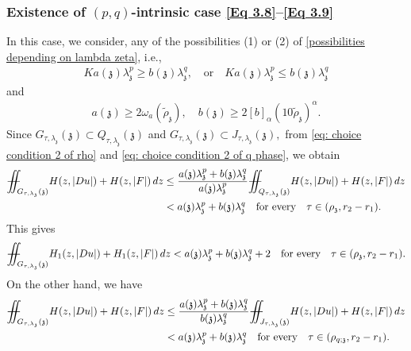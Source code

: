\documentclass[11pt,oneside, english,reqno,twoside a4paper]{amsart}
\theoremstyle{definition}
\numberwithin{theorem}{section}
\numberwithin{equation}{section}
\newcommand{\mfz}{\mathfrak{z}}
\newcommand{\iintss}{{\int\hspace{-0.28cm}\int}}
\newcommand{ \miints }{{\iintss\hspace{-0.56cm} -\hspace{-0.15cm}-}}
\newcommand{\miint}[1]{{\miints_{\hspace{-0.13cm}#1}}}
\begin{document}
\subsubsection{Existence of $(p,q)$-intrinsic case \eqref{Eq 3.8}--\eqref{Eq 3.9}} \label{deduction of pq case}
In this case, we consider, any of the possibilities (1)
or (2) of \eqref{possibilities depending on lambda zeta}, i.e., 
\begin{align*}
 Ka(\mathfrak z)\lambda^p_{\mfz}\geq b(\mfz)\lambda^q_{\mfz}, \quad \text{or}\quad Ka(\mathfrak z)\lambda^p_{\mfz}\leq b(\mfz)\lambda^q_{\mfz}   
\end{align*}
and 
\begin{align}\label{eq: pq phase assmp on ab}
a(\mathfrak{z})\geq 2\omega_a(\widetilde \rho_{\mathfrak{z}}),\quad b(\mathfrak{z})\geq 2[b]_{\alpha}\left(10 \widetilde \rho_{ \mathfrak{z}}\right)^{\alpha}.   
\end{align}
Since $G_{\tau, \lambda_{\mathfrak z}}(\mathfrak z)\subset Q_{\tau, \lambda_{\mathfrak z}}(\mathfrak z)$ and $G_{\tau, \lambda_{\mathfrak z}}(\mathfrak z)\subset J_{\tau, \lambda_{\mathfrak z}}(\mathfrak z),$ from \eqref{eq: choice condition 2 of rho} and \eqref{eq: choice condition 2 of q phase}, we obtain
\begin{align*}
    \miint{G_{\tau, \lambda_{\mathfrak z}}(\mathfrak z)}H(z, |Du|)+H(z, |F|)\, dz&\leq \frac{a(\mathfrak z)\lambda^p_{\mathfrak z}+b(\mathfrak z)\lambda^q_{\mathfrak z}}{a(\mathfrak z)\lambda^p_{\mathfrak z}}\miint{Q_{\tau, \lambda_{\mathfrak z}}(\mathfrak z)}H(z, |Du|)+H(z, |F|)\, dz\\
    &< a(\mathfrak z)\lambda^p_{\mathfrak z}+b(\mathfrak z)\lambda^q_{\mathfrak z}\quad \text{for every}\quad \tau \in (\rho_{\mathfrak z}, r_2-r_1).
\end{align*}
This gives
\begin{align*}
\miint{G_{\tau, \lambda_{\mathfrak z}}(\mathfrak z)}H_1(z, |Du|)+H_1(z, |F|)\, dz < a(\mathfrak z)\lambda^p_{\mathfrak z}+b(\mathfrak z)\lambda^q_{\mathfrak z}+2 \quad \text{for every}\quad \tau \in (\rho_{\mathfrak z}, r_2-r_1).   
\end{align*}
On the other hand, we have
\begin{align*}
    \miint{G_{\tau, \lambda_{\mathfrak z}}(\mathfrak z)}H(z, |Du|)+H(z, |F|)\, dz&\leq \frac{a(\mathfrak z)\lambda^p_{\mathfrak z}+b(\mathfrak z)\lambda^q_{\mathfrak z}}{b(\mathfrak z)\lambda^q_{\mathfrak z}}\miint{J_{\tau, \lambda_{\mathfrak z}}(\mathfrak z)}H(z, |Du|)+H(z, |F|)\, dz\\
    &< a(\mathfrak z)\lambda^p_{\mathfrak z}+b(\mathfrak z)\lambda^q_{\mathfrak z}\quad \text{for every}\quad \tau \in (\rho_{q; \mathfrak z}, r_2-r_1).
\end{align*}
\end{document}
